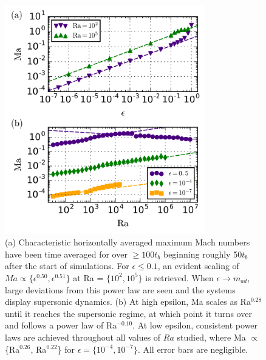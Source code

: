 \documentclass[aps, prl, twocolumn, nofootinbib, groupedaddress, amsfonts, amssymb, amsmath]{revtex4-1}
\begin{document}
\begin{figure}[t]
\includegraphics[width=3.4375in]{./figs/ma_v_eps.png}
\caption{(a) Characteristic horizontally averaged maximum Mach numbers have been
time averaged for over $\geq 100t_{b}$ beginning roughly 50$t_{b}$ after the start of simulations. For $\epsilon \leq 0.1$,
an evident scaling of $Ma \propto \{\epsilon^{0.50}, \epsilon^{0.51}\}$ 
at Ra = $\{10^2, 10^5\}$ is retrieved.
When $\epsilon \rightarrow m_{ad}$, large deviations from this power law are seen and the systems display
supersonic dynamics.  
(b) At high epsilon, Ma scales as Ra$^{0.28}$ until it reaches the supersonic regime, at which point it turns
over and follows a power law of Ra$^{-0.10}$.  At low epsilon, consistent power laws are achieved throughout all
values of $Ra$ studied, where Ma $\propto$ \{Ra$^{0.26}$, Ra$^{0.22}$\} for $\epsilon = \{10^{-4}, 10^{-7}\}$. All
error bars are negligible.  \label{fig:ma_v_eps} }
\end{figure}
\end{document}

